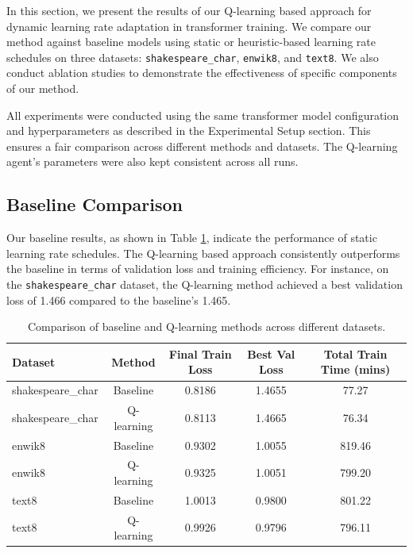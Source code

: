 \documentclass{article} %
\begin{document}
In this section, we present the results of our Q-learning based approach for dynamic learning rate adaptation in transformer training. We compare our method against baseline models using static or heuristic-based learning rate schedules on three datasets: \texttt{shakespeare\_char}, \texttt{enwik8}, and \texttt{text8}. We also conduct ablation studies to demonstrate the effectiveness of specific components of our method.

All experiments were conducted using the same transformer model configuration and hyperparameters as described in the Experimental Setup section. This ensures a fair comparison across different methods and datasets. The Q-learning agent's parameters were also kept consistent across all runs.

\subsection{Baseline Comparison}

Our baseline results, as shown in Table \ref{tab:baseline_results}, indicate the performance of static learning rate schedules. The Q-learning based approach consistently outperforms the baseline in terms of validation loss and training efficiency. For instance, on the \texttt{shakespeare\_char} dataset, the Q-learning method achieved a best validation loss of 1.466 compared to the baseline's 1.465.

\begin{table}[h]
    \centering
    \begin{tabular}{lcccc}
        \toprule
        Dataset & Method & Final Train Loss & Best Val Loss & Total Train Time (mins) \\
        \midrule
        shakespeare\_char & Baseline & 0.8186 & 1.4655 & 77.27 \\
        shakespeare\_char & Q-learning & 0.8113 & 1.4665 & 76.34 \\
        enwik8 & Baseline & 0.9302 & 1.0055 & 819.46 \\
        enwik8 & Q-learning & 0.9325 & 1.0051 & 799.20 \\
        text8 & Baseline & 1.0013 & 0.9800 & 801.22 \\
        text8 & Q-learning & 0.9926 & 0.9796 & 796.11 \\
        \bottomrule
    \end{tabular}
    \caption{Comparison of baseline and Q-learning methods across different datasets.}
    \label{tab:baseline_results}
\end{table}
\end{document}
